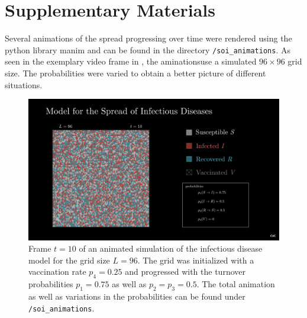 \section{Supplementary Materials}


Several animations of the spread progressing over time were rendered using the python library manim\cite{pypi_manim} and can be found in the directory \texttt{/soi\_animations}. 
As seen in the exemplary video frame in , the aminationsuse a simulated $96\times 96$ grid size. The probabilities were varied to obtain a better picture of different situations.

\begin{figure}[ht]
    \centering
    \includegraphics[width=1\textwidth]{images/soi_main_scene_75_50_50_25_t10.png}
    \caption{Frame $t=10$ of an animated simulation of the infectious disease model for the grid size $L=96$. The grid was initialized with a vaccination rate $p_4=0.25$ and progressed with 
    the turnover probabilities $p_1=0.75$ as well as $p_2=p_3=0.5$. The total animation as well as variations in the probabilities can be found under \texttt{/soi\_animations}.}\label{fig:apx_animation_inf_t}
\end{figure}